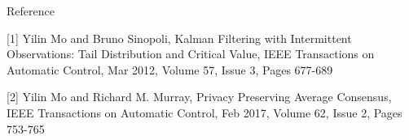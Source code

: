\documentclass[10pt]{beamer}
\DeclareMathOperator{\1}{\textbf{1}}
\begin{document}


\begin{frame}{Reference}

  [1] Yilin Mo and Bruno Sinopoli, Kalman Filtering with Intermittent Observations: Tail Distribution and Critical Value, IEEE Transactions on Automatic Control, Mar 2012, Volume 57, Issue 3, Pages 677-689


  [2] Yilin Mo and Richard M. Murray, Privacy Preserving Average Consensus, IEEE Transactions on Automatic Control, Feb 2017, Volume 62, Issue 2, Pages 753-765
\end{frame}
\end{document}
